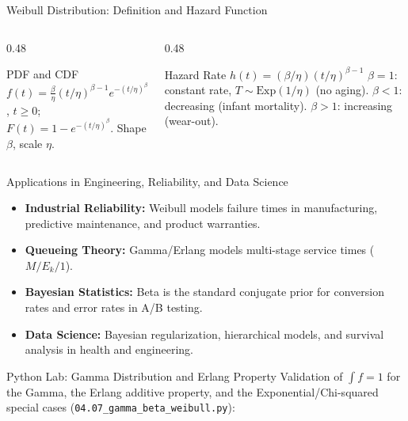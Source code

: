 \documentclass[aspectratio=169,xcolor={dvipsnames,table}]{beamer}
\begin{document}
\begin{frame}{Weibull Distribution: Definition and Hazard Function}
	\vspace{-0.15cm}
	\begin{columns}[T]
		\begin{column}{0.48\textwidth}
			\begin{block}{PDF and CDF}
				\footnotesize
				$f(t) = \frac{\beta}{\eta}(t/\eta)^{\beta-1}e^{-(t/\eta)^{\beta}}$, $t\ge0$; $F(t)=1-e^{-(t/\eta)^{\beta}}$. Shape $\beta$, scale $\eta$.
			\end{block}
		\end{column}
		\begin{column}{0.48\textwidth}
			\begin{alertblock}{Hazard Rate $h(t)=(\beta/\eta)(t/\eta)^{\beta-1}$}
				\footnotesize
				$\beta=1$: constant rate, $T\sim\text{Exp}(1/\eta)$ (no aging). $\beta<1$: decreasing (infant mortality). $\beta>1$: increasing (wear-out).
			\end{alertblock}
		\end{column}
	\end{columns}
\end{frame}

\begin{frame}{Applications in Engineering, Reliability, and Data Science}
	\vspace{-0.1cm}
	\begin{itemize}\itemsep=0.1cm
		\item \textbf{Industrial Reliability:} Weibull models failure times in manufacturing, predictive maintenance, and product warranties. \pause
		\item \textbf{Queueing Theory:} Gamma/Erlang models multi-stage service times ($M/E_{k}/1$). \pause
		\item \textbf{Bayesian Statistics:} Beta is the standard conjugate prior for conversion rates and error rates in A/B testing. \pause
		\item \textbf{Data Science:} Bayesian regularization, hierarchical models, and survival analysis in health and engineering.
	\end{itemize}
\end{frame}

\begin{frame}[fragile]{Python Lab: Gamma Distribution and Erlang Property}
	\vspace{-0.05cm}
	\scriptsize
	Validation of $\int f = 1$ for the Gamma, the Erlang additive property, and the Exponential/Chi-squared special cases (\texttt{04.07\_gamma\_beta\_weibull.py}):
	{
	}
\end{frame}
\end{document}
